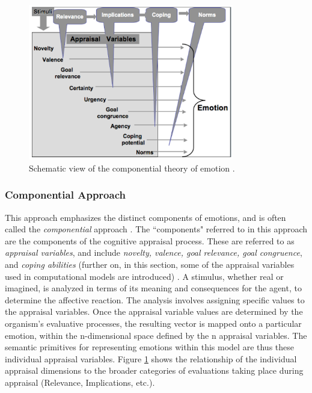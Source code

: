\documentclass[12pt]{report}
\begin{document}
\begin{figure}[tbh]
  \center
  \includegraphics[width=0.8\textwidth]{figure/cpm.png}
  \caption{Schematic view of the componential theory of emotion
  \cite{hudlicka:guidelines-emotions}.}
  \label{fig:cpm}
\end{figure}

\subsubsection{Componential Approach}
\label{sec:componential-theories}

This approach emphasizes the distinct components of emotions, and is often
called the \textit{componential} approach \cite{leventhal:emotion-cognition}.
The ``components" referred to in this approach are the components of the
cognitive appraisal process. These are referred to as \textit{appraisal
variables}, and include \textit{novelty, valence, goal relevance, goal
congruence}, and \textit{coping abilities}
(further on, in this section, some of the appraisal variables used in
computational models are introduced)
\cite{scherer:nature-function-emotion,scherer:appraisal-processes}. A stimulus,
whether real or imagined, is analyzed in terms of its meaning and consequences
for the agent, to determine the affective reaction. The analysis involves
assigning specific values to the appraisal variables. Once the appraisal
variable values are determined by the organism’s evaluative processes, the
resulting vector is mapped onto a particular emotion, within the n-dimensional
space defined by the n appraisal variables. The semantic primitives for
representing emotions within this model are thus these individual appraisal
variables. Figure \ref{fig:cpm} shows the relationship of the individual
appraisal dimensions to the broader categories of evaluations taking place
during appraisal (Relevance, Implications, etc.).
\end{document}

